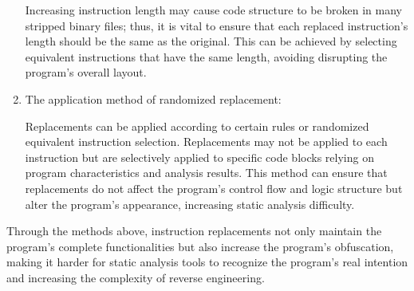 \begin{enumerate}
Increasing instruction length may cause code structure to be broken in many stripped binary files; thus, it is vital to ensure that each replaced instruction's length should be the same as the original. This can be achieved by selecting equivalent instructions that have the same length, avoiding disrupting the program's overall layout.

\item The application method of randomized replacement:

Replacements can be applied according to certain rules or randomized equivalent instruction selection. Replacements may not be applied to each instruction but are selectively applied to specific code blocks relying on program characteristics and analysis results. This method can ensure that replacements do not affect the program's control flow and logic structure but alter the program's appearance, increasing static analysis difficulty.

\end{enumerate}

Through the methods above, instruction replacements not only maintain the program's complete functionalities but also increase the program's obfuscation, making it harder for static analysis tools to recognize the program's real intention and increasing the complexity of reverse engineering.

